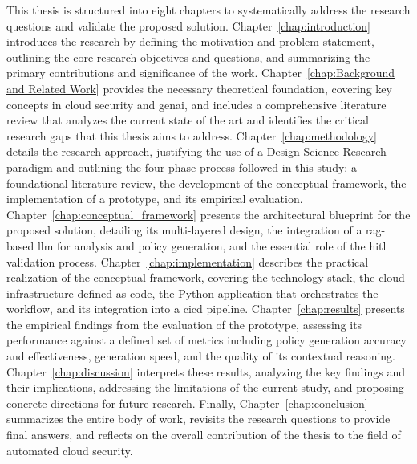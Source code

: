 This thesis is structured into eight chapters to systematically address the research questions and validate the proposed solution. Chapter~\ref{chap:introduction} introduces the research by defining the motivation and problem statement, outlining the core research objectives and questions, and summarizing the primary contributions and significance of the work. Chapter~\ref{chap:Background and Related Work} provides the necessary theoretical foundation, covering key concepts in cloud security and \gls{genai}, and includes a comprehensive literature review that analyzes the current state of the art and identifies the critical research gaps that this thesis aims to address. Chapter~\ref{chap:methodology} details the research approach, justifying the use of a Design Science Research paradigm and outlining the four-phase process followed in this study: a foundational literature review, the development of the conceptual framework, the implementation of a prototype, and its empirical evaluation. Chapter~\ref{chap:conceptual_framework} presents the architectural blueprint for the proposed solution, detailing its multi-layered design, the integration of a \gls{rag}-based \gls{llm} for analysis and policy generation, and the essential role of the \gls{hitl} validation process. Chapter~\ref{chap:implementation} describes the practical realization of the conceptual framework, covering the technology stack, the cloud infrastructure defined as code, the Python application that orchestrates the workflow, and its integration into a \gls{cicd} pipeline. Chapter~\ref{chap:results} presents the empirical findings from the evaluation of the prototype, assessing its performance against a defined set of metrics including policy generation accuracy and effectiveness, generation speed, and the quality of its contextual reasoning. Chapter~\ref{chap:discussion} interprets these results, analyzing the key findings and their implications, addressing the limitations of the current study, and proposing concrete directions for future research. Finally, Chapter~\ref{chap:conclusion} summarizes the entire body of work, revisits the research questions to provide final answers, and reflects on the overall contribution of the thesis to the field of automated cloud security.
